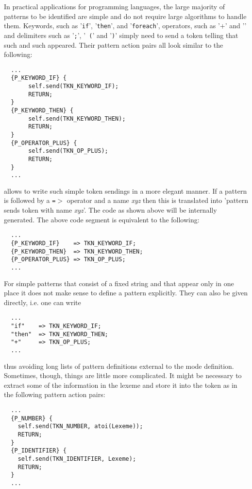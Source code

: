 In practical applications for programming languages, the large majority of
patterns to be identified are simple and do not require large algorithms to
handle them. Keywords, such as '{\tt if}', '{\tt then}', and '{\tt foreach}',
operators, such as '$+$' and '{\tt *}' and delimiters such as '{\tt ;}', '{\tt
  (}' and '{\tt )}' simply need to send a token telling that such and such
appeared. Their pattern action pairs all look similar to the following:

\begin{lstlisting}
  ...
  {P_KEYWORD_IF} {
       self.send(TKN_KEYWORD_IF);
       RETURN;
  }
  {P_KEYWORD_THEN} {
       self.send(TKN_KEYWORD_THEN);
       RETURN;
  }
  {P_OPERATOR_PLUS} {
       self.send(TKN_OP_PLUS);
       RETURN;
  }
  ...
\end{lstlisting}

{\Quex} allows to write such simple token sendings in a more elegant manner.
If a pattern is followed by a {\tt =$>$} operator and a name {\it xyz} then
this is translated into 'pattern sends token with name {\it xyz}'. The code as
shown above will be internally generated. The above code segment is equivalent
to the following:

\begin{lstlisting}
  ...
  {P_KEYWORD_IF}    => TKN_KEYWORD_IF;
  {P_KEYWORD_THEN}  => TKN_KEYWORD_THEN;
  {P_OPERATOR_PLUS} => TKN_OP_PLUS;
  ...
\end{lstlisting}

For simple patterns that consist of a fixed string and that appear only in one
place it does not make sense to define a pattern explicitly. They can also be
given directly, i.e. one can write

\begin{lstlisting}
  ...
  "if"    => TKN_KEYWORD_IF;
  "then"  => TKN_KEYWORD_THEN;
  "+"     => TKN_OP_PLUS;
  ...
\end{lstlisting}

thus avoiding long lists of pattern definitions external to the mode
definition. Sometimes, though, things are little more complicated.  It might
be necessary to extract some of the information in the lexeme and store it
into the token as in the following pattern action pairs:

\begin{lstlisting}
  ...
  {P_NUMBER} {
    self.send(TKN_NUMBER, atoi(Lexeme));
    RETURN; 
  }
  {P_IDENTIFIER} { 
    self.send(TKN_IDENTIFIER, Lexeme); 
    RETURN; 
  }
  ...
\end{lstlisting}

